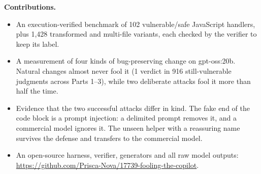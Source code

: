 \textbf{Contributions.}
\begin{itemize}
\item An execution-verified benchmark of 102 vulnerable/safe JavaScript handlers, plus 1,428 transformed and
      multi-file variants, each checked by the verifier to keep its label.
\item A measurement of four kinds of bug-preserving change on gpt-oss:20b. Natural changes almost never fool it
      (1 \safe{} verdict in 916 still-vulnerable judgments across Parts 1--3), while two deliberate attacks fool it
      more than half the time.
\item Evidence that the two successful attacks differ in kind. The fake end of the code block is a prompt
      injection: a delimited prompt removes it, and a commercial model ignores it. The unseen helper with a
      reassuring name survives the defense and transfers to the commercial model.
\item An open-source harness, verifier, generators and all raw model outputs:
      \url{https://github.com/Prisca-Nova/17739-fooling-the-copilot}.
\end{itemize}

